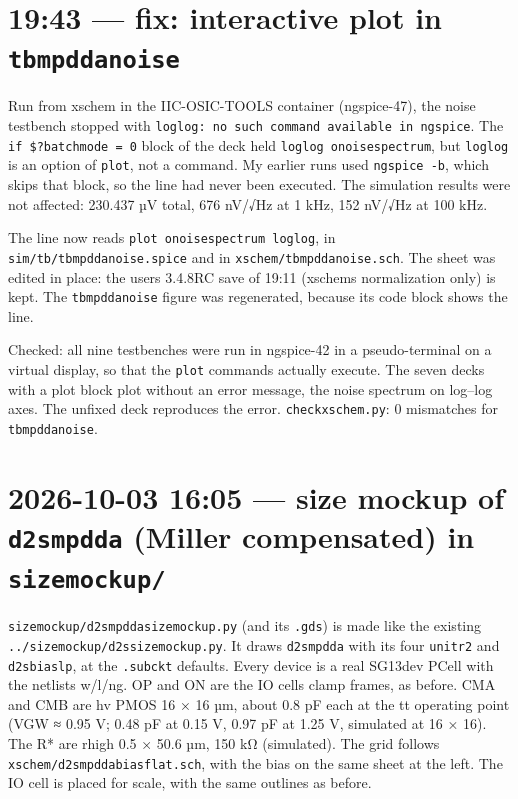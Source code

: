 \documentclass[11pt,a4paper]{article}
\renewcommand{\_}{\textunderscore\hspace{0pt}}
\begin{document}
\hypertarget{1943--fix-interactive-plot-in-tb_mpdda_noise}{%
\section{\texorpdfstring{19:43 --- fix:
interactive plot in
\texttt{tb\_mpdda\_noise}}{19:43 --- fix: interactive plot in tb\_mpdda\_noise}}\label{1943--fix-interactive-plot-in-tb_mpdda_noise}}

Run from xschem in the IIC-OSIC-TOOLS container
(ngspice-47), the noise testbench stopped with
\texttt{loglog:\ no\ such\ command\ available\ in\ ngspice}.
The \texttt{if\ \$?batchmode\ =\ 0} block of the
deck held \texttt{loglog\ onoise\_spectrum}, but
\texttt{loglog} is an option of \texttt{plot}, not
a command. My earlier runs used
\texttt{ngspice\ -b}, which skips that block, so
the line had never been executed. The simulation
results were not affected: 230.437 µV total, 676
nV/√Hz at 1 kHz, 152 nV/√Hz at 100 kHz.

The line now reads
\texttt{plot\ onoise\_spectrum\ loglog}, in
\texttt{sim/tb/tb\_mpdda\_noise.spice} and in
\texttt{xschem/tb\_mpdda\_noise.sch}. The sheet
was edited in place: the user\textquotesingle s
3.4.8RC save of 19:11 (xschem\textquotesingle s
normalization only) is kept. The
\texttt{tb\_mpdda\_noise} figure was regenerated,
because its code block shows the line.

Checked: all nine testbenches were run in
ngspice-42 in a pseudo-terminal on a virtual
display, so that the \texttt{plot} commands
actually execute. The seven decks with a plot
block plot without an error message, the noise
spectrum on log--log axes. The unfixed deck
reproduces the error. \texttt{check\_xschem.py}: 0
mismatches for \texttt{tb\_mpdda\_noise}.

\hypertarget{2026-10-03-1605--size-mockup-of-d2s_mpdda-miller-compensated-in-size_mockup}{%
\section{\texorpdfstring{2026-10-03 16:05 --- size
mockup of \texttt{d2s\_mpdda} (Miller compensated)
in
\texttt{size\_mockup/}}{2026-10-03 16:05 --- size mockup of d2s\_mpdda (Miller compensated) in size\_mockup/}}\label{2026-10-03-1605--size-mockup-of-d2s_mpdda-miller-compensated-in-size_mockup}}

\texttt{size\_mockup/d2s\_mpdda\_size\_mockup.py}
(and its \texttt{.gds}) is made like the existing
\texttt{../size\_mockup/d2s\_size\_mockup.py}. It
draws \texttt{d2s\_mpdda} with its four
\texttt{unit\_r2} and \texttt{d2s\_bias\_lp}, at
the \texttt{.subckt} defaults. Every device is a
real SG13\_dev PCell with the
netlist\textquotesingle s w/l/ng. OP and ON are
the IO cell\textquotesingle s clamp frames, as
before. CMA and CMB are hv PMOS 16 × 16 µm, about
0.8 pF each at the tt operating point (V\_GW ≈
0.95 V; 0.48 pF at 0.15 V, 0.97 pF at 1.25 V,
simulated at 16 × 16). The R\_* are rhigh 0.5 ×
50.6 µm, 150 kΩ (simulated). The grid follows
\texttt{xschem/d2s\_mpdda\_bias\_flat.sch}, with
the bias on the same sheet at the left. The IO
cell is placed for scale, with the same outlines
as before.
\end{document}
